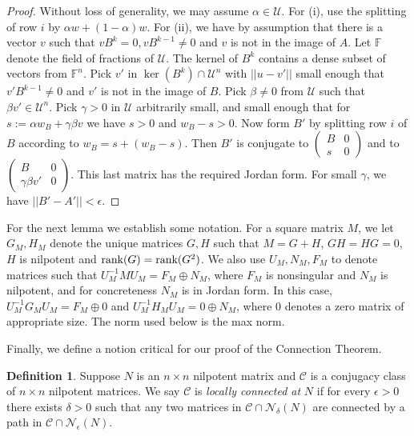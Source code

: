 \documentclass{amsart}
\theoremstyle{definition}
\newtheorem{definition}[theorem]{Definition}
\theoremstyle{remark}
\numberwithin{equation}{section}
\begin{document}
{{\begin{proof}
 Without loss of generality, we may assume 
$\alpha \in \mathcal U$. 
For (i), use the splitting of  row $i$ by $\alpha w + (1-\alpha )w$. 
For (ii), we have by assumption that there is a vector $v$ 
such that $vB^k=0, vB^{k-1} \neq 0$ and $v$ is not in the image of 
$A$. Let $\mathbb F$ denote the field of fractions of $\mathcal U$. 
The kernel of $B^k$ contains a dense subset of vectors from 
$\mathbb F^n$. Pick $v'$ in $\ker(B^k)\cap \mathcal U^n$ with 
$||u-v'||$ small enough that $v'B^{k-1}\neq 0$ and 
$v'$ is not in the image of $B$. Pick $\beta \neq 0$ from $\mathcal U$ 
such that $\beta v'\in \mathcal U^n$. 
Pick $\gamma >0$ in $\mathcal U$ arbitrarily small, and small enough 
that for $s:= \alpha w_B + \gamma \beta v$ we have $s>0$ and 
$w_B-s>0$. Now form $B'$ by splitting row $i$ of $B$ according 
to  $w_B=s + (w_B -s)$. Then $B'$ is conjugate to 
$ \left(\begin{smallmatrix} B & 0 \\s & 0
\end{smallmatrix} \right)$ and to 
 $ \left(\begin{smallmatrix} B & 0 \\\gamma \beta v' & 0
\end{smallmatrix} \right)$. This last matrix has the required 
Jordan form. For small $\gamma$, we have $||B'-A'||< \epsilon$. 
\end{proof} 


For the next lemma we establish some notation. 
For a square matrix $M$, we let $G_M,H_M$ denote
the unique matrices $G,H$ such that $M=G+H$,
$GH=HG=0$, $H$ is nilpotent and $\textnormal{rank}(G)=
\textnormal{rank}(G^2)$. We also use $U_M,N_M,F_M$ 
to denote matrices such that $U^{-1}_MMU_M=F_M\oplus N_M$, where 
$F_M$ is nonsingular and $N_M$ is nilpotent, 
and for concreteness $N_M$ is in Jordan form.  
In this case, 
$U^{-1}_MG_MU_M=F_M\oplus 0$ and 
$U^{-1}_MH_MU_M=0\oplus N_M$, where $0$ denotes a zero 
matrix of appropriate size. 
The norm used below is the max norm. 

Finally,   we define a notion critical for our proof 
of the Connection Theorem. 

\begin{definition} \label{localconnectednessdefinition}
Suppose $N$ is an $n\times n$ nilpotent matrix and 
$\mathcal C$ is a 
 conjugacy class of  $n\times n$ 
nilpotent matrices. We say $\mathcal C$ is 
{\it locally connected at} $N$ if  for every $\epsilon >0$ 
there exists 
$\delta >0$ such that any two matrices in 
$\mathcal C \cap \mathcal N_{\delta}(N)$ are connected 
by a path in $\mathcal C \cap\mathcal N_{\epsilon}(N)$.
\end{definition} 



}}
\end{document}
